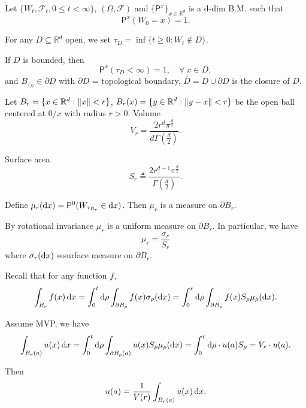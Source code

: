 Let $\{W_t,\mathcal{F}_t, 0 \leq t < \infty\}$, $(\Omega,\mathcal{F})$ and $\{\mathsf{P}^x\}_{x\in \mathbb{R}^d}$ is a d-dim B.M. such that 
$$
    \mathsf{P}^x(W_0 = x) = 1.
$$

For any $D \subseteq \mathbb{R}^d$ open, we set $\tau _D = \inf\{t \geq 0: W_t \notin D\}$.

If $D$ is bounded, then 
$$
    \mathsf{P}^x(\tau_D < \infty) = 1, \quad \forall~ x \in D,
$$
and $B_{\tau_D} \in \partial D$ with $\partial D$ = topological boundary, $\overline{D} = D \cup \partial D$ is the closure of $D$.

Let $B_r = \{ x\in \mathbb{R}^d: \left\|  x  \right\| <r\}$, $B_r(x) = \{y\in \mathbb{R}^d: \left\|  y-x  \right\| < r\}$ be the open ball centered at $0/x$ with radius $r > 0$. Volume 
$$V_r = \frac{2 r^d \pi^{\frac{d}{2}}}{d \Gamma(\frac{d}{2})}.$$

Surface area 
$$
S_r \triangleq \frac{2 r^{d-1}\pi^{\frac{d}{2}}}{\Gamma(\frac{d}{2})}.
$$

Define $\mu_r (\mathop{}\!\mathrm{d} x) = \mathsf{P}^0(W_{\tau_{B_r}} \in \mathop{}\!\mathrm{d} x)$. Then $\mu_r$ is a measure on $\partial B_r$.

By rotational invariance $\mu_r$ is a uniform measure on $\partial B_r$. In particular, we have
$$
\mu_r = \frac{\sigma_r}{S_r}
$$
where $\sigma_r(\mathop{}\!\mathrm{d} x)=$surface measure on $\partial B_r$.

Recall that for any function $f$,
$$
\int_{B_r} f(x) \mathop{}\!\mathrm{d} x = \int_0^t \mathop{}\!\mathrm{d}  \rho \int_{\partial B_{\rho}} f(x) \sigma_\rho (\mathop{}\!\mathrm{d} x) = \int_0^r \mathop{}\!\mathrm{d}  \rho \int_{\partial B_{\rho}}f(x) S_\rho \mu_\rho(\mathop{}\!\mathrm{d} x).
$$


Assume MVP, we have 
$$
\int_{B_r(a)} u(x)\mathop{}\!\mathrm{d} x = \int_0^t \mathop{}\!\mathrm{d}  \rho \int_{\partial B_{\rho}(a)} u(x)S_\rho \mu_\rho(\mathop{}\!\mathrm{d} x) = \int_0^r \mathop{}\!\mathrm{d} \rho \cdot u(a)S_\rho = V_r \cdot u(a).
$$

Then 
$$
u(a) = \frac{1}{V(r)}\int_{B_r(a)} u(x) \mathop{}\!\mathrm{d} x.
$$


